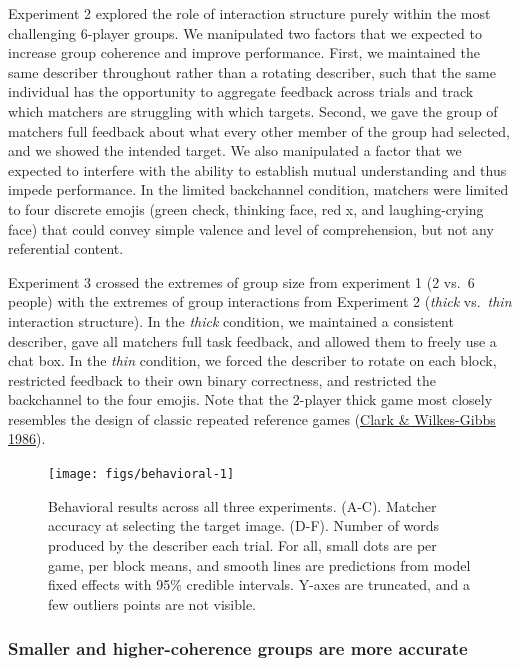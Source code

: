 \documentclass[
  english,
]{article}
\begin{document}
Experiment 2 explored the role of interaction structure purely within the most challenging 6-player groups.
We manipulated two factors that we expected to increase group coherence and improve performance.
First, we maintained the same describer throughout rather than a rotating describer, such that the same individual has the opportunity to aggregate feedback across trials and track which matchers are struggling with which targets.
Second, we gave the group of matchers full feedback about what every other member of the group had selected, and we showed the intended target.
We also manipulated a factor that we expected to interfere with the ability to establish mutual understanding and thus impede performance.
In the limited backchannel condition, matchers were limited to four discrete emojis (green check, thinking face, red x, and laughing-crying face) that could convey simple valence and level of comprehension, but not any referential content.

Experiment 3 crossed the extremes of group size from experiment 1 (2 vs.~6 people) with the extremes of group interactions from Experiment 2 (\emph{thick} vs.~\emph{thin} interaction structure).
In the \emph{thick} condition, we maintained a consistent describer, gave all matchers full task feedback, and allowed them to freely use a chat box.
In the \emph{thin} condition, we forced the describer to rotate on each block, restricted feedback to their own binary correctness, and restricted the backchannel to the four emojis.
Note that the 2-player thick game most closely resembles the design of classic repeated reference games (\protect\hyperlink{ref-clark1986}{Clark \& Wilkes-Gibbs 1986}).

\begin{figure}[t!]

{\centering \texttt{[image: figs/behavioral-1]} 

}

\caption{Behavioral results across all three experiments. (A-C). Matcher accuracy at selecting the target image. (D-F). Number of words produced by the describer each trial. For all, small dots are per game, per block means, and smooth lines are predictions from model fixed effects with 95\% credible intervals. Y-axes are truncated, and a few outliers points are not visible.}\label{fig:behavioral}
\end{figure}

\hypertarget{smaller-and-higher-coherence-groups-are-more-accurate}{%
\subsubsection{Smaller and higher-coherence groups are more accurate}\label{smaller-and-higher-coherence-groups-are-more-accurate}}
\end{document}
